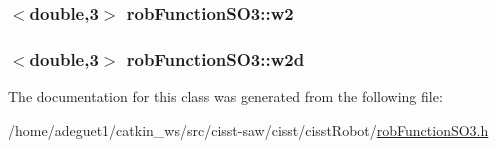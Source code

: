\hypertarget{classrob_function_s_o3_af26136555c376caff1bb1e84f1b3b3f1}{
\subsubsection[{w2}]{$<$double,3$>$ rob\-Function\-S\-O3\-::w2\hspace{0.3cm}{\ttfamily [protected]}}}\label{classrob_function_s_o3_af26136555c376caff1bb1e84f1b3b3f1}
\hypertarget{classrob_function_s_o3_a888acaf14bf3ff075b5a13e811e52ab0}{
\subsubsection[{w2d}]{$<$double,3$>$ rob\-Function\-S\-O3\-::w2d\hspace{0.3cm}{\ttfamily [protected]}}}\label{classrob_function_s_o3_a888acaf14bf3ff075b5a13e811e52ab0}


The documentation for this class was generated from the following file\-:\begin{DoxyCompactItemize}
\item 
/home/adeguet1/catkin\-\_\-ws/src/cisst-\/saw/cisst/cisst\-Robot/\hyperlink{rob_function_s_o3_8h}{rob\-Function\-S\-O3.\-h}\end{DoxyCompactItemize}
